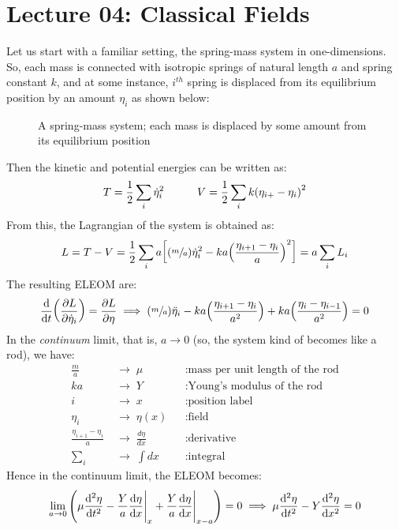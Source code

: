 \section*{Lecture 04: Classical Fields}
Let us start with a familiar setting, the spring-mass system in one-dimensions. So, each mass is connected with isotropic springs of natural length $a$ and spring constant $k$, and at some instance, $i^{th}$ spring is displaced from its equilibrium position by an amount $\eta_i$ as shown below:
\begin{figure}[H]
    \centering
    
    \caption{A spring-mass system; each mass is displaced by some amount from its equilibrium position}
\end{figure}
Then the kinetic and potential energies can be written as:
$$T = \frac{1}{2}\sum\limits_i\dot{\eta}_i^2 \qquad \quad V = \frac{1}{2}\sum\limits_{i}k \qty(\eta_{i+}-\eta_i)^2 $$
From this, the Lagrangian of the system is obtained as:
$$L = T-V = \frac{1}{2}\sum \limits_i a \qty[\qty(\sfrac{m}{a}) \dot{\eta}_i^2 - ka \qty(\frac{\eta_{i+1}-\eta_i}{a})^2] = a\sum\limits_i L_i $$
The resulting ELEOM are:
$$\dv{t}\qty(\pdv{L}{\dot{\eta}_i}) = \pdv{L}{\eta}\implies \qty(\sfrac{m}{a})\ddot{\eta}_i - ka \qty(\frac{\eta_{i+1}-\eta_i}{a^2}) + ka\qty(\frac{\eta_i - \eta_{i-1}}{a^2})=0$$
In the \textit{continuum} limit, that is, $a\rightarrow 0$ (so, the system kind of becomes like a rod), we have:
\begin{align*}
    \frac{m}{a} &\;\longrightarrow\; \mu 
        && :\text{mass per unit length of the rod} \\[6pt]
    ka &\;\longrightarrow\; Y 
        && :\text{Young's modulus of the rod} \\[6pt]
    i &\;\longrightarrow\; x 
        && :\text{position label} \\[6pt]
    \eta_i &\;\longrightarrow\; \eta(x) 
        && :\text{field} \\[6pt]
    \frac{\eta_{i+1}-\eta_{i}}{a} &\;\longrightarrow\; \frac{d\eta}{dx} 
        && :\text{derivative} \\[6pt]
    \sum_{i} &\;\longrightarrow\; \int dx 
        && :\text{integral}
\end{align*}
Hence in the continuum limit, the ELEOM becomes:
\begin{align*}
    \lim\limits_{a\rightarrow 0} \qty(\mu \dv[2]{\eta}{t} - \frac{Y}{a} \dv{\eta}{x}\Bigg|_{x} + \frac{Y}{a}\dv{\eta}{x}\Bigg|_{x-a}) = 0 \implies \mu \dv[2]{\eta}{t}  - Y \dv[2]{\eta}{x} = 0
\end{align*}
